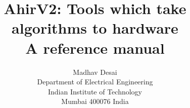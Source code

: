 
\documentclass[12pt]{article}
\usepackage{epsfig}
\usepackage{graphics}

\title{AhirV2: Tools which take algorithms to hardware \\ A reference manual }
\author{Madhav Desai \\ Department of Electrical Engineering \\ Indian Institute of Technology \\
	Mumbai 400076 India}

\newcommand{\Aa}{{\bf Aa}~}
\newcommand{\vC}{{\bf vC}~}


\maketitle

\section{What is AhirV2?}

AhirV2 is a set of tools which can convert a C 
description of a system to  an equivalent hardware
implementation (described in VHDL).  Using these tools,
it is possible to take an algorithmic approach to 
the design of  hardware.

The flow of transformations is illustrated in Figure \ref{fig:AhirFlow}.
\begin{figure}
\begin{centering}
\centerline{}
\caption{AhirV2 flow}
\end{centering}
 \label{fig:AhirFlow}
\end{figure}

